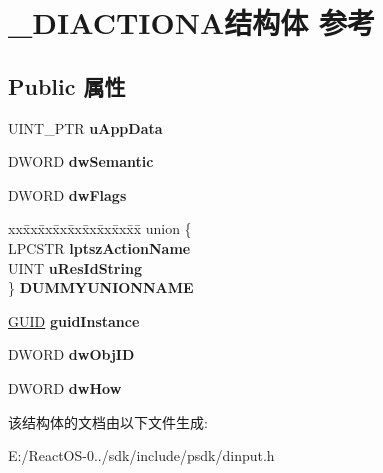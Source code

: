 \hypertarget{struct___d_i_a_c_t_i_o_n_a}{}\section{\+\_\+\+D\+I\+A\+C\+T\+I\+O\+N\+A结构体 参考}
\label{struct___d_i_a_c_t_i_o_n_a}
\subsection*{Public 属性}
\begin{DoxyCompactItemize}
\item 
\mbox{\label{struct___d_i_a_c_t_i_o_n_a_ac210e7479eebd187e28c2ae8cebb910f}} 
U\+I\+N\+T\+\_\+\+P\+TR {\bfseries u\+App\+Data}
\item 
\mbox{\label{struct___d_i_a_c_t_i_o_n_a_a41bd184c9a4a054395c0a700d3f71d25}} 
D\+W\+O\+RD {\bfseries dw\+Semantic}
\item 
\mbox{\label{struct___d_i_a_c_t_i_o_n_a_a319820594a1da3c1f22501e3524e2e05}} 
D\+W\+O\+RD {\bfseries dw\+Flags}
\item 
\mbox{\label{struct___d_i_a_c_t_i_o_n_a_aa6b0dd3c379e8ca5b8753ccbe142dab1}} 
\begin{tabbing}
xx\=xx\=xx\=xx\=xx\=xx\=xx\=xx\=xx\=\kill
union \{\\
\>LPCSTR {\bfseries lptszActionName}\\
\>UINT {\bfseries uResIdString}\\
\} {\bfseries DUMMYUNIONNAME}\\

\end{tabbing}\item 
\mbox{\label{struct___d_i_a_c_t_i_o_n_a_ae7f647fe32f52f7ab1fe4af03471b377}} 
\hyperlink{interface_g_u_i_d}{G\+U\+ID} {\bfseries guid\+Instance}
\item 
\mbox{\label{struct___d_i_a_c_t_i_o_n_a_a3f79655d43672e2969230495702468b3}} 
D\+W\+O\+RD {\bfseries dw\+Obj\+ID}
\item 
\mbox{\label{struct___d_i_a_c_t_i_o_n_a_a01d09f8d0a1ee3c29768f219344d05a8}} 
D\+W\+O\+RD {\bfseries dw\+How}
\end{DoxyCompactItemize}


该结构体的文档由以下文件生成\+:\begin{DoxyCompactItemize}
\item 
E\+:/\+React\+O\+S-\/0../sdk/include/psdk/dinput.\+h\end{DoxyCompactItemize}
